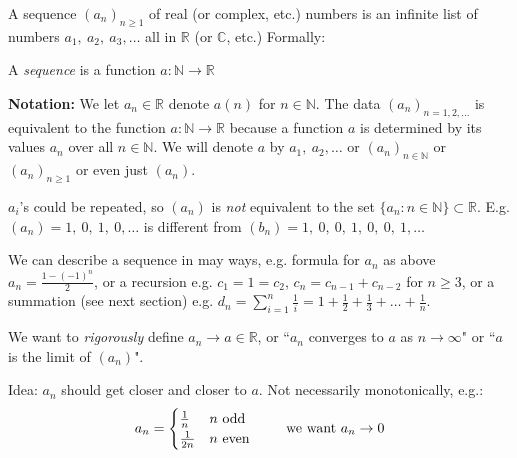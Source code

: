 \documentclass[10pt,twoside]{scrartcl}
\begin{document}
\label{sub:sequences}

A 
sequence $(a_n)_{n\geq 1}$ of real (or complex, etc.) numbers is an infinite list of numbers $a_1,~a_2,~a_3,\dots$ all in $\mathbb{R}$ (or $\mathbb{C}$, etc.) Formally:\\

\begin{definition}
	A \emph{sequence} is a function $a:\mathbb{N} \to \mathbb{R}$
\end{definition}

\textbf{Notation:} We let $a_n \in \mathbb{R}$ denote $a(n)$ for $n \in \mathbb{N}$. The data $(a_n)_{n=1,2,\dots}$ is equivalent to the function $a:\mathbb{N} \to \mathbb{R}$ because a function $a$ is determined by its values $a_n$ over all $n \in \mathbb{N}$. We will denote $a$ by $a_1,~a_2,\dots$ or $(a_n)_{n\in\mathbb{N}}$ or $(a_n)_{n\geq 1}$ or even just $(a_n)$.\vspace*{5pt}

\begin{remark}
$a_i$'s could be repeated, so $(a_n)$ is \emph{not} equivalent to the set $\{a_n : n \in \mathbb{N}\}\subset \mathbb{R}$. E.g. $(a_n) = 1,~0,~1,~0,\dots$ is different from $(b_n) = 1,~0,~0,~1,~0,~0,~1,\dots$	
\end{remark}

We can describe a sequence in may ways, e.g. formula for $a_n$ as above $a_n = \frac{1-(-1)^n}{2}$, or a recursion e.g. $c_1 = 1 = c_2$, $c_n = c_{n-1} + c_{n-2}$ for $n\geq 3$, or a summation (see next section) e.g. $d_n = \sum_{i=1}^n \frac{1}{i} = 1 + \frac{1}{2} + \frac{1}{3} + \dots +\frac{1}{n}$.

We want to \emph{rigorously} define $a_n \to a \in \mathbb{R}$, or ``$a_n$ converges to $a$ as $n \to \infty$" or ``$a$ is the limit of $(a_n)$". 

Idea: $a_n$ should get closer and closer to $a$. Not necessarily monotonically, e.g.:
\[a_n = 
\begin{cases}
\frac{1}{n} & n \text{ odd}\\
\frac{1}{2n} & n \text{ even}	
\end{cases}
\hspace*{20pt}\text{ we want } a_n \to 0\]
\end{document}

